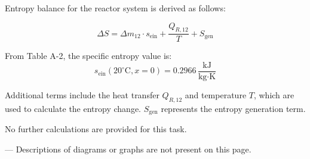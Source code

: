 Entropy balance for the reactor system is derived as follows:  

\[
\Delta S = \Delta m_{12} \cdot s_{\text{ein}} + \frac{Q_{R,12}}{T} + S_{\text{gen}}
\]

From Table A-2, the specific entropy value is:  
\[
s_{\text{ein}} (20^\circ\text{C}, x=0) = 0.2966 \, \frac{\text{kJ}}{\text{kg·K}}
\]

Additional terms include the heat transfer \( Q_{R,12} \) and temperature \( T \), which are used to calculate the entropy change. \( S_{\text{gen}} \) represents the entropy generation term.  

No further calculations are provided for this task.  

---  
Descriptions of diagrams or graphs are not present on this page.